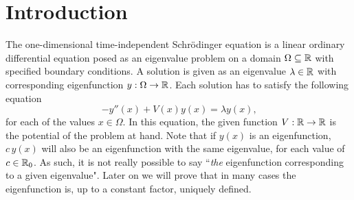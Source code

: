 

\label{cha:c2}

\section{Introduction}

The one-dimensional time-independent Schrödinger equation is a linear ordinary differential equation posed as an eigenvalue problem on a domain $\Omega \subseteq \mathbb{R}$ with specified boundary conditions. A solution is given as an eigenvalue $\lambda \in \mathbb{R}$ with corresponding eigenfunction $y: \Omega \to \mathbb{R}$. Each solution has to satisfy the following equation
$$
    -y''(x) + V(x)y(x) = \lambda y(x)\text{,}
$$
for each of the values $x\in \Omega$. In this equation, the given function $V: \mathbb{R} \to \mathbb{R}$ is the potential of the problem at hand. Note that if $y(x)$ is an eigenfunction, $c\,y(x)$ will also be an eigenfunction with the same eigenvalue, for each value of $c \in \mathbb{R}_0$. As such, it is not really possible to say ``\emph{the} eigenfunction corresponding to a given eigenvalue". Later on we will prove that in many cases the eigenfunction is, up to a constant factor, uniquely defined.

